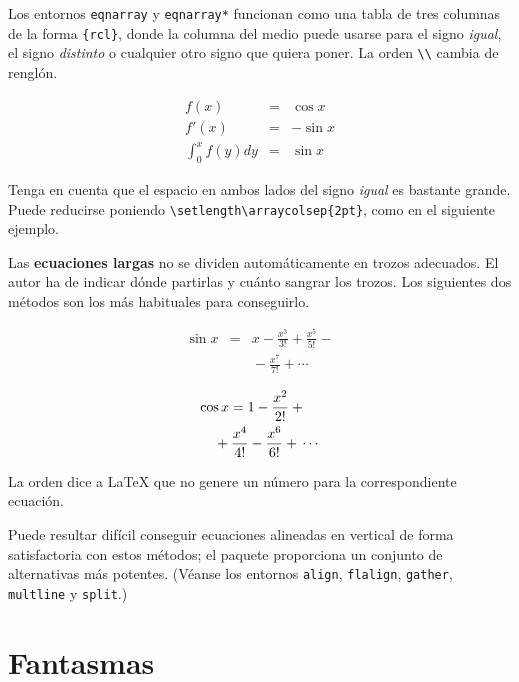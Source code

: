 Los entornos \texttt{eqnarray} y \verb|eqnarray*| funcionan como una tabla de tres columnas de la forma \verb|{rcl}|, donde la columna del medio puede usarse para el signo \emph{igual}, el signo \emph{distinto} o cualquier otro signo que quiera poner.  La orden \verb|\\| cambia de renglón.
\begin{example}
\begin{eqnarray}
f(x) & = & \cos x     \\
f'(x) & = & -\sin x   \\
\int_{0}^{x} f(y)dy &
 = & \sin x
\end{eqnarray}
\end{example}
Tenga en cuenta que el espacio en ambos lados del signo \emph{igual} es bastante grande.  Puede reducirse poniendo \verb|\setlength\arraycolsep{2pt}|, como en el siguiente ejemplo.

 Las \textbf{ecuaciones largas} no se dividen automáticamente en trozos adecuados.  El autor ha de indicar dónde partirlas y cuánto sangrar los trozos.  Los siguientes dos métodos son los más habituales para conseguirlo. \begin{example}
{\setlength\arraycolsep{2pt}
\begin{eqnarray}
\sin x & = & x -\frac{x^{3}}{3!}
     +\frac{x^{5}}{5!}-{}
                    \nonumber\\
&& {}-\frac{x^{7}}{7!}+{}\cdots
\end{eqnarray}}
\end{example}
\begin{example}
\begin{eqnarray}
\lefteqn{ \cos x = 1
     -\frac{x^{2}}{2!} +{} }
                    \nonumber\\
 & & {}+\frac{x^{4}}{4!}
     -\frac{x^{6}}{6!}+{}\cdots
\end{eqnarray}
\end{example}

La orden  dice a \LaTeX{} que no genere un número para la correspondiente ecuación.

Puede resultar difícil conseguir ecuaciones alineadas en vertical de forma satisfactoria con estos métodos; el paquete  proporciona un conjunto de alternativas más potentes. (Véanse los entornos \verb|align|, \verb|flalign|, \verb|gather|, \verb|multline| y \verb|split|.)

\section{Fantasmas}


